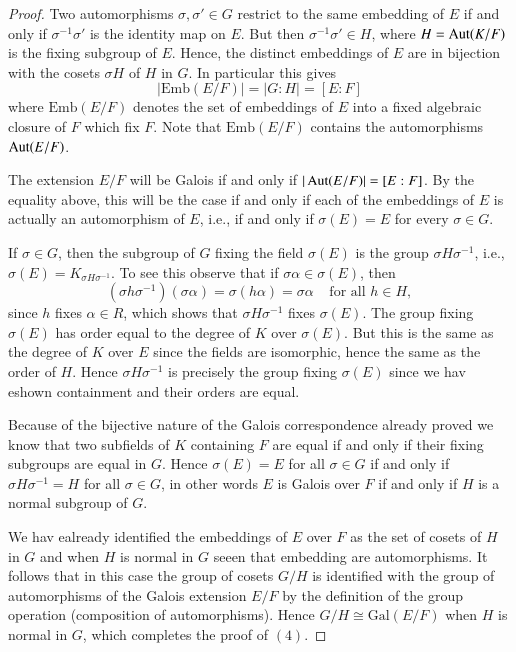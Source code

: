 \begin{proof}
    Two automorphisms $\sigma,\sigma' \in G$ restrict to the same embedding of $E$ if and only if $\sigma^{-1}\sigma'$ is the identity map on $E$. But then $\sigma^{-1}\sigma' \in H$, where $H = \operatorname{Aut}(K/F)$ is the fixing subgroup of $E$. Hence, the distinct embeddings of $E$ are in bijection with the cosets $\sigma H$ of $H$ in $G$. In particular this gives \begin{equation*}
        |\text{Emb}(E/F)| = |G:H| = [E:F]
    \end{equation*}
    where $\text{Emb}(E/F)$ denotes the set of embeddings of $E$ into a fixed algebraic closure of $F$ which fix $F$. Note that $\text{Emb}(E/F)$ contains the automorphisms $\operatorname{Aut}(E/F)$.

    The extension $E/F$ will be Galois if and only if $|\operatorname{Aut}(E/F)| = [E:F]$. By the equality above, this will be the case if and only if each of the embeddings of $E$ is actually an automorphism of $E$, i.e., if and only if $\sigma(E) = E$ for every $\sigma \in G$.

    If $\sigma \in G$, then the subgroup of $G$ fixing the field $\sigma(E)$ is the group $\sigma H\sigma^{-1}$, i.e., $\sigma(E) = K_{\sigma H\sigma^{-1}}$. To see this observe that if $\sigma \alpha \in \sigma(E)$, then $$(\sigma h\sigma^{-1})(\sigma\alpha) = \sigma(h\alpha) = \sigma \alpha\;\;\;\;\text{for all } h \in H,$$ since $h$ fixes $\alpha \in R$, which shows that $\sigma H \sigma^{-1}$ fixes $\sigma(E)$. The group fixing $\sigma(E)$ has order equal to the degree of $K$ over $\sigma(E)$. But this is the same as the degree of $K$ over $E$ since the fields are isomorphic, hence the same as the order of $H$. Hence $\sigma H\sigma^{-1}$ is precisely the group fixing $\sigma(E)$ since we hav eshown containment and their orders are equal.

    Because of the bijective nature of the Galois correspondence already proved we know that two subfields of $K$ containing $F$ are equal if and only if their fixing subgroups are equal in $G$. Hence $\sigma(E) = E$ for all $\sigma \in G$ if and only if $\sigma H \sigma^{-1} = H$ for all $\sigma \in G$, in other words $E$ is Galois over $F$ if and only if $H$ is a normal subgroup of $G$.

    We hav ealready identified the embeddings of $E$ over $F$ as the set of cosets of $H$ in $G$ and when $H$ is normal in $G$ seeen that embedding are automorphisms. It follows that in this case the group of cosets $G/H$ is identified with the group of automorphisms of the Galois extension $E/F$ by the definition of the group operation (composition of automorphisms). Hence $G/H\cong \text{Gal}(E/F)$ when $H$ is normal in $G$, which completes the proof of $(4)$.


\end{proof}
